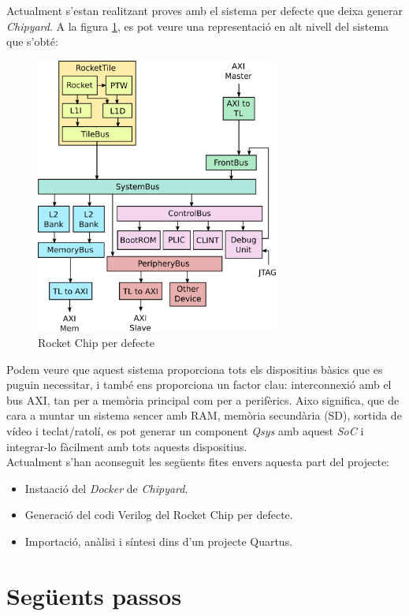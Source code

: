 \documentclass{article}
\begin{document}
Actualment s'estan realitzant proves amb el sistema per defecte que deixa generar \textit{Chipyard}. A la figura \ref{fig:rocketchip}, es pot veure una representació en alt nivell del sistema que s'obté:\\

\begin{figure}[h]
\centering
\includegraphics[width=8cm]{rocketchip-diagram.png}
\caption{Rocket Chip per defecte}
\label{fig:rocketchip}
\end{figure}

Podem veure que aquest sistema proporciona tots els dispositius bàsics que es puguin necessitar, i també ens proporciona un factor clau: interconnexió amb el bus AXI, tan per a memòria principal com per a perifèrics. 
Aixo significa, que de cara a muntar un sistema sencer amb RAM, memòria secundària (SD), sortida de vídeo i teclat/ratolí, es pot generar un component \textit{Qsys} amb aquest \textit{SoC} i integrar-lo fàcilment amb tots aquests dispositius.\\

Actualment s'han aconseguit les següents fites envers aquesta part del projecte:
\begin{itemize}
    \item Insta\lgem ació del \textit{Docker} de \textit{Chipyard}.
    \item Generació del codi Verilog del Rocket Chip per defecte.
    \item Importació, anàlisi i síntesi dins d'un projecte Quartus.
\end{itemize}

\section{Següents passos}
\end{document}

